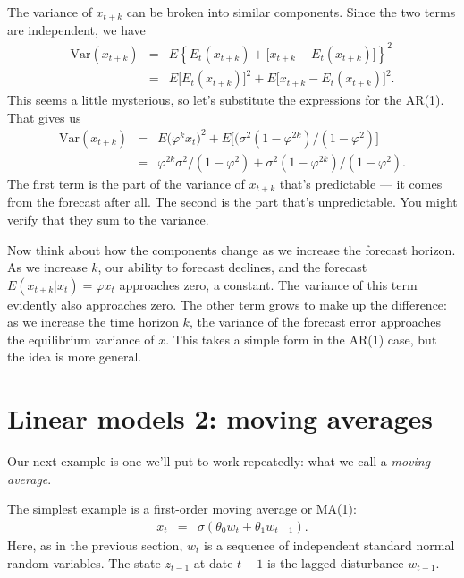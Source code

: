 \documentclass[11pt]{article}
\begin{document}
The variance of $x_{t+k}$ can be broken into similar
components.
Since the two terms are independent, we have
\begin{eqnarray*}
    \mbox{Var}(x_{t+k}) &=& E \left\{ E_t (x_{t+k}) + \big[ x_{t+k} - E_t (x_{t+k})\big]\right\}^2 \\
        &=& E \big[ E_t (x_{t+k}) \big]^2 + E \big[ x_{t+k} - E_t (x_{t+k})\big]^2 .
\end{eqnarray*}
This seems a little mysterious, so let's substitute the expressions
for the AR(1).
That gives us
\begin{eqnarray*}
    \mbox{Var}(x_{t+k}) &=& E \big( \varphi^k x_t \big)^2
            + E \big[(\sigma ^2 (1-\varphi^{2k})/(1-\varphi^2)\big] \\
            &=& \varphi^{2k} \sigma ^2 /(1-\varphi^2)
            +  \sigma ^2 (1-\varphi^{2k})/(1-\varphi^2) .
\end{eqnarray*}
The first term is the part of the variance of $x_{t+k}$ that's predictable ---
it comes from the forecast after all.
The second is the part that's unpredictable.
You might verify that they sum to the variance.

Now think about how the components change as we increase the forecast horizon.
As we increase $k$, our ability to forecast declines, and the forecast
$  E (x_{t+k} | x_t ) = \varphi x_t $ approaches zero, a constant.
The variance of this term evidently also approaches zero.
The other term grows to make up the difference:
as we increase the time horizon $k$, the variance of the forecast error
approaches the equilibrium variance of $x$.
This takes a simple form in the AR(1) case, but the idea
is more general.


\section{Linear models 2:  moving averages}

Our next example is one we'll put to work repeatedly:
what we call a {\it moving average\/}.

The simplest example is  a first-order moving average
or MA(1):
\begin{eqnarray}
    x_{t}  &=& \sigma \left( \theta_0 w_{t} + \theta_1 w_{t-1} \right) .
    \label{eq:ma1}
\end{eqnarray}
Here, as in the previous section,
$w_t$ is a sequence of independent standard normal random variables.
The state $z_{t-1}$ at date $t-1$ is the lagged disturbance $w_{t-1}$.
\end{document}

